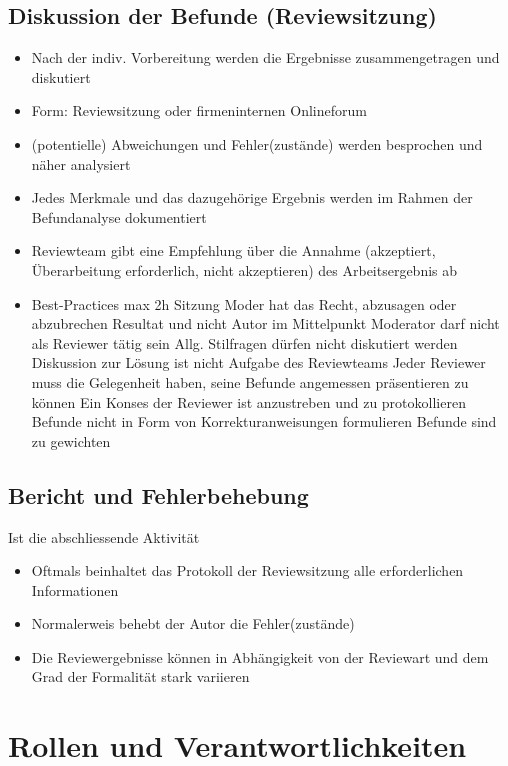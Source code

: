 \documentclass{report}
\theoremstyle{definition}
\theoremstyle{example}
\begin{document}
\subsection{Diskussion der Befunde (Reviewsitzung)}
\begin{itemize}
   \item Nach der indiv. Vorbereitung werden die Ergebnisse zusammengetragen und diskutiert
   \item Form: Reviewsitzung oder firmeninternen Onlineforum
   \item (potentielle) Abweichungen und Fehler(zustände) werden besprochen und näher analysiert
   \item Jedes Merkmale und das dazugehörige Ergebnis werden im Rahmen der Befundanalyse dokumentiert
   \item Reviewteam gibt eine Empfehlung über die Annahme (akzeptiert, Überarbeitung erforderlich, nicht akzeptieren) des Arbeitsergebnis ab
   \item Best-Practices
   \subitem max 2h Sitzung
   \subitem Moder hat das Recht, abzusagen oder abzubrechen
   \subitem Resultat und nicht Autor im Mittelpunkt
   \subitem Moderator darf nicht als Reviewer tätig sein
   \subitem Allg. Stilfragen dürfen nicht diskutiert werden
   \subitem Diskussion zur Lösung ist nicht Aufgabe des Reviewteams
   \subitem Jeder Reviewer muss die Gelegenheit haben, seine Befunde angemessen präsentieren zu können
   \subitem Ein Konses der Reviewer ist anzustreben und zu protokollieren
   \subitem Befunde nicht in Form von Korrekturanweisungen formulieren
   \subitem Befunde sind zu gewichten
\end{itemize}

\subsection{Bericht und Fehlerbehebung}
Ist die abschliessende Aktivität
\begin{itemize}
   \item Oftmals beinhaltet das Protokoll der Reviewsitzung alle erforderlichen Informationen
   \item Normalerweis behebt der Autor die Fehler(zustände)
   \item Die Reviewergebnisse können in Abhängigkeit von der Reviewart und dem Grad der Formalität stark variieren
\end{itemize}

\section{Rollen und Verantwortlichkeiten}
\end{document}
